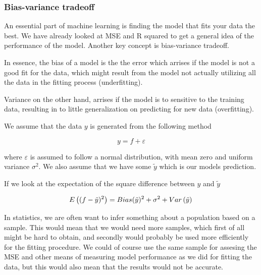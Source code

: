 \documentclass[12pt]{article}
\begin{document}

\subsubsection{Bias-variance tradeoff}

An essential part of machine learning is finding the model that fits your data the best.
We have already looked at MSE and R squared to get a general idea of the performance of the model.
Another key concept is bias-variance tradeoff.

In essence, the bias of a model is the the error which arrises if the model is not a good fit for the data, which might result from the model not actually utilizing all the data in the fitting process (underfitting). %

Variance on the other hand, arrises if the model is to sensitive to the training data, resulting in to little generalization on predicting for new data (overfitting).

We assume that the data $y$ is generated from the following method

\begin{equation*}
    y=f+\varepsilon
\end{equation*}

where $\varepsilon$ is assumed to follow a normal distribution, with mean zero and uniform variance $\sigma^2$.
We also assume that we have some $\tilde{y}$ which is our models prediction.

If we look at the expectation of the square difference between $y$ and $\tilde{y}$

\vspace{-1em}

\begin{equation}
 E\left((f - \tilde{y})^2\right) = Bias(\tilde{y})^2+\sigma^2+Var\left(\tilde{y}\right)\\
\end{equation}


In statistics, we are often want to infer something about a population based on a sample.
This would mean that we would need more samples, which first of all might be hard to obtain, and secondly would probably be used more efficiently for the fitting procedure.
We could of course use the same sample for assesing the MSE and other means of measuring model performance as we did for fitting the data,
but this would also mean that the results would not be accurate. %
\end{document}
